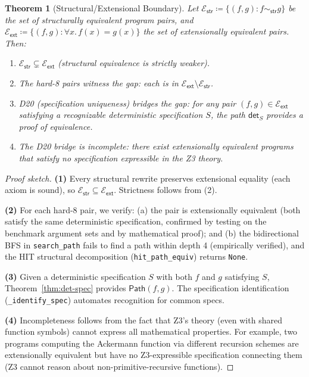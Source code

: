 \documentclass[11pt,a4paper]{report}
\theoremstyle{definition}
\theoremstyle{plain}
\newtheorem{theorem}[definition]{Theorem}
\newcommand{\Path}{\mathsf{Path}}
\begin{document}
\begin{theorem}[Structural/Extensional Boundary]
\label{thm:boundary}
Let $\mathcal{E}_{\mathsf{str}} \coloneqq \{(f, g) : f \sim_{\mathsf{str}} g\}$
be the set of structurally equivalent program pairs, and
$\mathcal{E}_{\mathsf{ext}} \coloneqq \{(f, g) : \forall x.\, f(x) = g(x)\}$
the set of extensionally equivalent pairs.  Then:
\begin{enumerate}
  \item $\mathcal{E}_{\mathsf{str}} \subsetneq \mathcal{E}_{\mathsf{ext}}$
    (structural equivalence is strictly weaker).
  \item The hard-8 pairs witness the gap:
    each is in $\mathcal{E}_{\mathsf{ext}} \setminus
    \mathcal{E}_{\mathsf{str}}$.
  \item D20 (specification uniqueness) bridges the gap: for any pair
    $(f, g) \in \mathcal{E}_{\mathsf{ext}}$ satisfying a
    \emph{recognizable} deterministic specification $S$, the path
    $\mathsf{det}_S$ provides a proof of equivalence.
  \item The D20 bridge is \emph{incomplete}: there exist extensionally
    equivalent programs that satisfy no specification expressible in
    the Z3 theory.
\end{enumerate}
\end{theorem}

\begin{proof}[Proof sketch]
\textbf{(1)} Every structural rewrite preserves extensional equality
(each axiom is sound), so
$\mathcal{E}_{\mathsf{str}} \subseteq \mathcal{E}_{\mathsf{ext}}$.
Strictness follows from (2).

\textbf{(2)} For each hard-8 pair, we verify:
(a) the pair is extensionally equivalent (both satisfy the same
deterministic specification, confirmed by testing on the benchmark
argument sets and by mathematical proof); and
(b) the bidirectional BFS in \texttt{search\_path} fails to find a
path within depth 4 (empirically verified), and the HIT structural
decomposition (\texttt{hit\_path\_equiv}) returns \texttt{None}.

\textbf{(3)} Given a deterministic specification $S$ with both $f$ and
$g$ satisfying $S$, Theorem~\ref{thm:det-spec} provides
$\Path(f, g)$.  The specification identification
(\texttt{\_identify\_spec}) automates recognition for common specs.

\textbf{(4)} Incompleteness follows from the fact that Z3's theory
(even with shared function symbols) cannot express all mathematical
properties.  For example, two programs computing the Ackermann function
via different recursion schemes are extensionally equivalent but have
no Z3-expressible specification connecting them (Z3 cannot reason
about non-primitive-recursive functions).
\end{proof}
\end{document}
